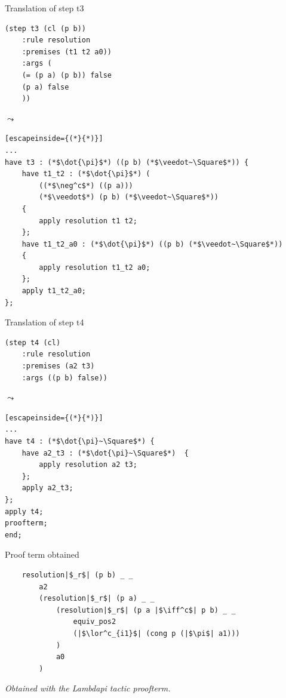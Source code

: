\documentclass[aspectratio=169,xcolor={dvipsnames}]{beamer}
\begin{document}
\begin{frame}[fragile]{Translation of step t3}
\noindent\begin{minipage}{.35\textwidth}
\begin{verbatim}
(step t3 (cl (p b)) 
    :rule resolution
    :premises (t1 t2 a0))
    :args (
    (= (p a) (p b)) false
    (p a) false
    ))
\end{verbatim}
\end{minipage}
$\leadsto$\hfill \begin{minipage}{.55\textwidth}
\begin{lstlisting}[escapeinside={(*}{*)}]
...
have t3 : (*$\dot{\pi}$*) ((p b) (*$\veedot~\Square$*)) {
    have t1_t2 : (*$\dot{\pi}$*) (
        ((*$\neg^c$*) ((p a))) 
        (*$\veedot$*) (p b) (*$\veedot~\Square$*))
    {
        apply resolution t1 t2;
    };
    have t1_t2_a0 : (*$\dot{\pi}$*) ((p b) (*$\veedot~\Square$*))
    {
        apply resolution t1_t2 a0;
    };
    apply t1_t2_a0;
};
\end{lstlisting}
\end{minipage}
\end{frame}
    

\begin{frame}[fragile]{Translation of step t4}
\noindent\begin{minipage}{.35\textwidth}
\begin{verbatim}
(step t4 (cl)
    :rule resolution
    :premises (a2 t3)
    :args ((p b) false))
\end{verbatim}
\end{minipage}
$\leadsto$\hfill\begin{minipage}{.55\textwidth}
\begin{lstlisting}[escapeinside={(*}{*)}]
...
have t4 : (*$\dot{\pi}~\Square$*) {
    have a2_t3 : (*$\dot{\pi}~\Square$*)  {
        apply resolution a2 t3;
    };
    apply a2_t3;
};
apply t4;
proofterm;
end;
\end{lstlisting}
\end{minipage}
\end{frame}


\begin{frame}[fragile]{Proof term obtained}
\begin{verbatim}
    resolution|$_r$| (p b) _ _
        a2
        (resolution|$_r$| (p a) _ _
            (resolution|$_r$| (p a |$\iff^c$| p b) _ _
                equiv_pos2
                (|$\lor^c_{i1}$| (cong p (|$\pi$| a1)))
            )
            a0
        )

\end{verbatim}
\textit{Obtained with the Lambdapi tactic proofterm.}
\end{frame}
\end{document}
